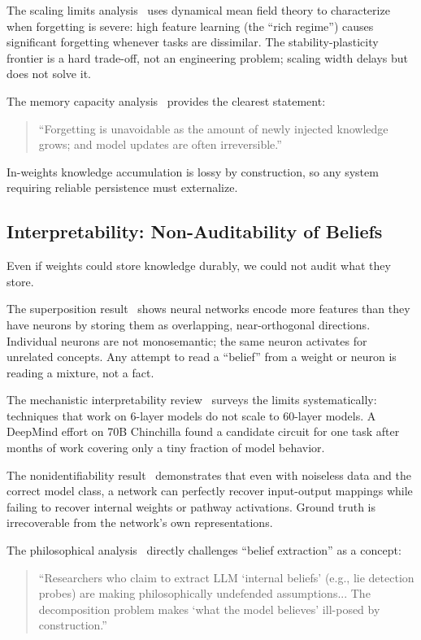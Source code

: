 \documentclass[11pt,letterpaper]{article}
\begin{document}
The scaling limits analysis~\cite{scaling2025} uses dynamical mean field theory to characterize when forgetting is severe: high feature learning (the ``rich regime'') causes significant forgetting whenever tasks are dissimilar. The stability-plasticity frontier is a hard trade-off, not an engineering problem; scaling width delays but does not solve it.

The memory capacity analysis~\cite{markov2026} provides the clearest statement:

\begin{quote}
``Forgetting is unavoidable as the amount of newly injected knowledge grows; and model updates are often irreversible.''
\end{quote}

In-weights knowledge accumulation is lossy by construction, so any system requiring reliable persistence must externalize.

\subsection{Interpretability: Non-Auditability of Beliefs}

Even if weights could store knowledge durably, we could not audit what they store.

The superposition result~\cite{anthropic2022} shows neural networks encode more features than they have neurons by storing them as overlapping, near-orthogonal directions. Individual neurons are not monosemantic; the same neuron activates for unrelated concepts. Any attempt to read a ``belief'' from a weight or neuron is reading a mixture, not a fact.

The mechanistic interpretability review~\cite{mechinterp2024} surveys the limits systematically: techniques that work on 6-layer models do not scale to 60-layer models. A DeepMind effort on 70B Chinchilla found a candidate circuit for one task after months of work covering only a tiny fraction of model behavior.

The nonidentifiability result~\cite{nonidentifiability2026} demonstrates that even with noiseless data and the correct model class, a network can perfectly recover input-output mappings while failing to recover internal weights or pathway activations. Ground truth is irrecoverable from the network's own representations.

The philosophical analysis~\cite{williams2025} directly challenges ``belief extraction'' as a concept:

\begin{quote}
``Researchers who claim to extract LLM `internal beliefs' (e.g., lie detection probes) are making philosophically undefended assumptions... The decomposition problem makes `what the model believes' ill-posed by construction.''
\end{quote}
\end{document}

